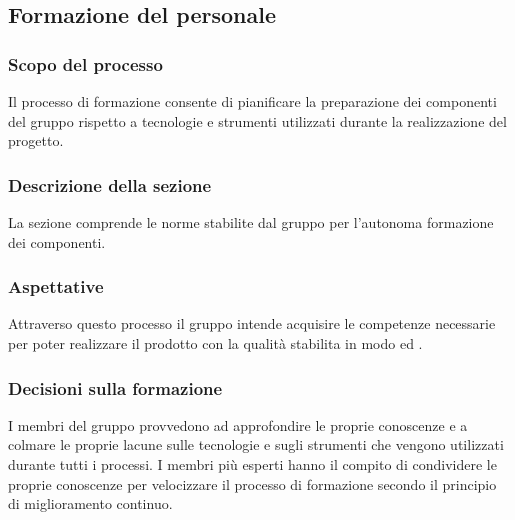 \subsection{Formazione del personale}
\subsubsection{Scopo del processo}
Il processo di formazione consente di pianificare la preparazione dei componenti del gruppo rispetto a tecnologie e strumenti utilizzati durante la realizzazione del progetto.
\subsubsection{Descrizione della sezione}
La sezione comprende le norme stabilite dal gruppo per l'autonoma formazione dei componenti.
\subsubsection{Aspettative}
Attraverso questo processo il gruppo intende acquisire le competenze necessarie per poter realizzare il prodotto con la qualità stabilita in modo  ed .
\subsubsection{Decisioni sulla formazione}\label{DecisioniFormazione}
I membri del gruppo provvedono ad approfondire le proprie conoscenze e a colmare le proprie lacune sulle tecnologie e sugli strumenti che vengono utilizzati durante tutti i processi. I membri più esperti hanno il compito di condividere le proprie conoscenze per velocizzare il processo di formazione secondo il principio di miglioramento continuo.